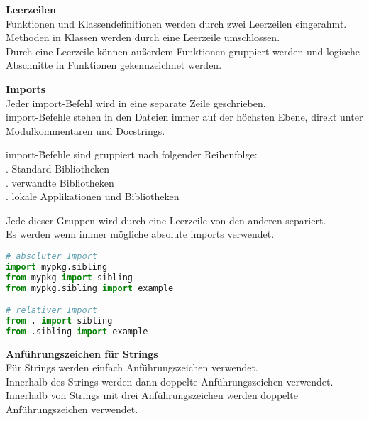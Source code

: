 \textbf{Leerzeilen}\\
Funktionen und Klassendefinitionen werden durch zwei Leerzeilen eingerahmt.\\
Methoden in Klassen werden durch eine Leerzeile umschlossen.\\
Durch eine Leerzeile können außerdem Funktionen gruppiert werden und logische Abschnitte in Funktionen gekennzeichnet werden.

\textbf{Imports}\\
Jeder import-Befehl wird in eine separate Zeile geschrieben.\\
import-Befehle stehen in den Dateien immer auf der höchsten Ebene, direkt unter Modulkommentaren und Docstrings.
\begin{tabbing}
import-\= Befehle sind gruppiert nach folgender Reihenfolge:\\
. Standard-Bibliotheken \\
. verwandte Bibliotheken \\
. lokale Applikationen und Bibliotheken\\
\end{tabbing}
Jede dieser Gruppen wird durch eine Leerzeile von den anderen separiert.\\
Es werden wenn immer mögliche absolute imports verwendet. 
\begin{lstlisting}[language = Python, caption = absolute imports, label = lst:imports]
# absoluter Import
import mypkg.sibling
from mypkg import sibling
from mypkg.sibling import example

# relativer Import
from . import sibling
from .sibling import example
\end{lstlisting}

\textbf{Anführungszeichen für Strings}\\
Für Strings werden einfach Anführungszeichen verwendet.\\
Innerhalb des Strings werden dann doppelte Anführungszeichen verwendet.\\
Innerhalb von Strings mit drei Anführungszeichen werden doppelte Anführungszeichen verwendet.\\

